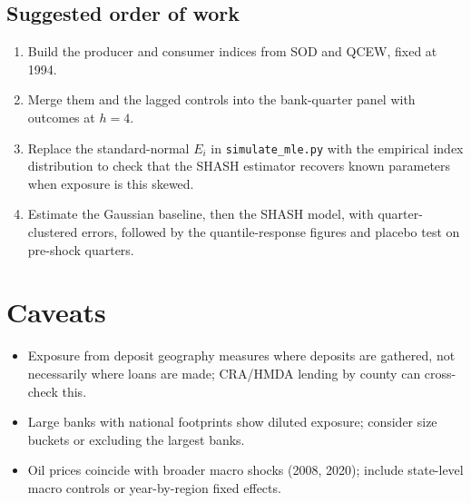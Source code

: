 \documentclass[11pt]{article}
\begin{document}
\subsection*{Suggested order of work}
\begin{enumerate}
  \item Build the producer and consumer indices from SOD and QCEW, fixed at 1994.
  \item Merge them and the lagged controls into the bank-quarter panel with outcomes at $h=4$.
  \item Replace the standard-normal $E_i$ in \texttt{simulate\_mle.py} with the empirical index distribution to check that the SHASH estimator recovers known parameters when exposure is this skewed.
  \item Estimate the Gaussian baseline, then the SHASH model, with quarter-clustered errors, followed by the quantile-response figures and placebo test on pre-shock quarters.
\end{enumerate}

\section{Caveats}
\begin{itemize}
  \item Exposure from deposit geography measures where deposits are gathered, not necessarily where loans are made; CRA/HMDA lending by county can cross-check this.
  \item Large banks with national footprints show diluted exposure; consider size buckets or excluding the largest banks.
  \item Oil prices coincide with broader macro shocks (2008, 2020); include state-level macro controls or year-by-region fixed effects.
\end{itemize}
\end{document}
